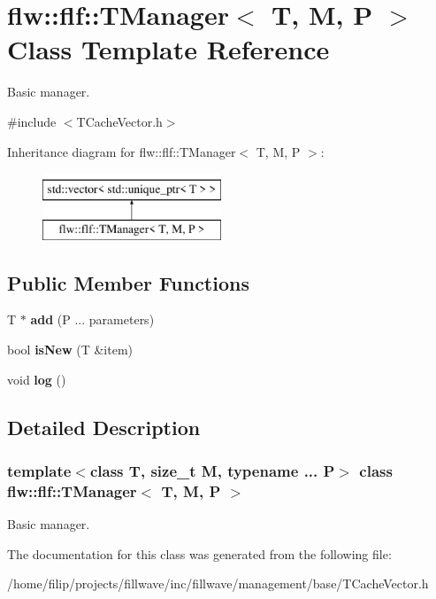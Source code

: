 \hypertarget{classflw_1_1flf_1_1TManager}{}\section{flw\+:\+:flf\+:\+:T\+Manager$<$ T, M, P $>$ Class Template Reference}
\label{classflw_1_1flf_1_1TManager}


Basic manager.  




{\ttfamily \#include $<$T\+Cache\+Vector.\+h$>$}

Inheritance diagram for flw\+:\+:flf\+:\+:T\+Manager$<$ T, M, P $>$\+:\begin{figure}[H]
\begin{center}
\leavevmode
\includegraphics[height=2.000000cm]{classflw_1_1flf_1_1TManager}
\end{center}
\end{figure}
\subsection*{Public Member Functions}
\begin{DoxyCompactItemize}
\item 
\mbox{\label{classflw_1_1flf_1_1TManager_a0aad11eac6db14afd219db80d021b487}} 
T $\ast$ {\bfseries add} (P ... parameters)
\item 
\mbox{\label{classflw_1_1flf_1_1TManager_a626091038d8f90db4dee5ff398ca04b9}} 
bool {\bfseries is\+New} (T \&item)
\item 
\mbox{\label{classflw_1_1flf_1_1TManager_a475ce027f66ca5cab77a72672e181f2d}} 
void {\bfseries log} ()
\end{DoxyCompactItemize}


\subsection{Detailed Description}
\subsubsection*{template$<$class T, size\+\_\+t M, typename ... P$>$\newline
class flw\+::flf\+::\+T\+Manager$<$ T, M, P $>$}

Basic manager. 

The documentation for this class was generated from the following file\+:\begin{DoxyCompactItemize}
\item 
/home/filip/projects/fillwave/inc/fillwave/management/base/T\+Cache\+Vector.\+h\end{DoxyCompactItemize}
